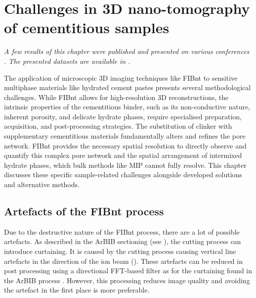 \chapter{Challenges in 3D nano-tomography of cementitious samples}

\textit{A few results of this chapter were published and presented on various conferences \cite{kleiner.2021b,kleiner.2021c,kleiner.2025f}. The presented datasets are available in \cite{kleiner.2026c}.}

The application of microscopic 3D imaging techniques like \ac{FIBnt} to sensitive multiphase materials like hydrated cement pastes presents several methodological challenges.
While \ac{FIBnt} allows for high-resolution 3D reconstructions, the intrinsic properties of the cementitious binder, such as its non-conductive nature, inherent porosity, and delicate hydrate phases, require specialised preparation, acquisition, and post-processing strategies.
The substitution of clinker with supplementary cementitious materials fundamentally alters and refines the pore network.
\ac{FIBnt} provides the necessary spatial resolution to directly observe and quantify this complex pore network and the spatial arrangement of intermixed hydrate phases, which bulk methods like \ac{MIP} cannot fully resolve.
This chapter discusses these specific sample-related challenges alongside developed solutions and alternative methods.

\section{Artefacts of the \acs*{FIBnt} process}

Due to the destructive nature of the \ac{FIBnt} process, there are a lot of possible artefacts.
As described in the \ac{ArBIB} sectioning (see ), the cutting process can introduce curtaining.
It is caused by the cutting process causing vertical line artefacts in the direction of the ion beam ().
These artefacts can be reduced in post processing using a directional \ac{FFT}-based filter as for the curtaining found in the \ac{ArBIB} process \cite{fitschen.2017,schankula.2018}.
However, this processing reduces image quality and avoiding the artefact in the first place is more preferable.

